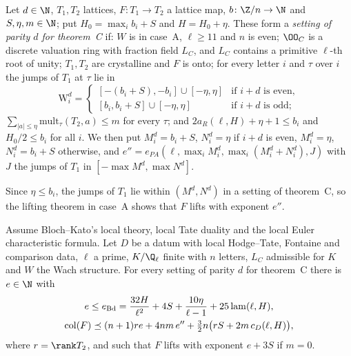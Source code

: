 \begin{definition}\label{pf:linkN-adm:def-setC}
Let $d\in\N$, $T_1,T_2$ lattices, $F\colon T_1\to T_2$ a lattice map, $b\colon\Z/n\to\N$ and $S,\eta,m\in\N$; put
$H_0=\max_ib_i+S$ and $H=H_0+\eta$. These form a \emph{setting of parity $d$ for theorem~C} if: $W$ is in case~A,
$\ell\ge11$ and $n$ is even; $\OO_C$ is a discrete valuation ring with fraction field $L_C$, and $L_C$ contains a primitive
$\ell$-th root of unity; $T_1,T_2$ are crystalline and $F$ is onto; for every letter $i$ and $\tau$ over $i$ the jumps of
$T_1$ at $\tau$ lie in
\[
\mathrm{W}^d_i=\begin{cases}[-(b_i+S),-b_i]\cup[-\eta,\eta]&\text{if }i+d\text{ is even},\\
[b_i,b_i+S]\cup[-\eta,\eta]&\text{if }i+d\text{ is odd;}\end{cases}
\]
$\sum_{|a|\le\eta}\mathrm{mult}_\tau(T_2,a)\le m$ for every $\tau$; and $2a_R(\ell,H)+\eta+1\le b_i$ and $H_0/2\le b_i$ for
all $i$. We then put $M^d_i=b_i+S$, $N^d_i=\eta$ if $i+d$ is even, $M^d_i=\eta$, $N^d_i=b_i+S$ otherwise, and
$e''=e_{PA}(\ell,\max_iM^d_i,\max_i(M^d_i+N^d_i),J)$ with $J$ the jumps of $T_1$ in $[-\max M^d,\max N^d]$.
\end{definition}

Since $\eta\le b_i$, the jumps of $T_1$ lie within $(M^d,N^d)$ in a setting of theorem~C, so the lifting theorem in
case~A shows that $F$ lifts with exponent $e''$.

\begin{theorem}[Theorem~C]\label{pf:linkN-adm:thmC}
Assume Bloch--Kato's local theory, local Tate duality and the local Euler characteristic formula. Let $D$ be a datum with
local Hodge--Tate, Fontaine and comparison data, $\ell$ a prime, $K/\Q_\ell$ finite with $n$ letters, $L_C$ admissible for
$K$ and $W$ the Wach structure. For every setting of parity $d$ for theorem~C there is $e\in\N$ with
\begin{gather*}
e\le e_{\mathrm{Bd}}=\frac{32H}{\ell^2}+4S+\frac{10\eta}{\ell-1}+25\,\mathrm{lam}(\ell,H),\\
\operatorname{col}(F)\preceq(n+1)re+4nm\,e''+\tfrac32n\bigl(rS+2m\,c_D(\ell,H)\bigr),
\end{gather*}
where $r=\rank T_2$, and such that $F$ lifts with exponent $e+3S$ if $m=0$.
\end{theorem}

